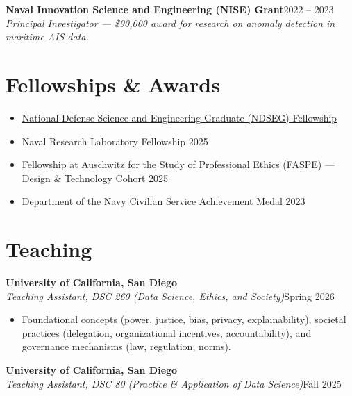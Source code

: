 \documentclass[11pt,letterpaper]{article}
\newcommand{\entry}[4]{%
  \textbf{#1}\hfill #2\\
  \textit{#3}\hfill #4\par}
\begin{document}
\textbf{Naval Innovation Science and Engineering (NISE) Grant}\hfill 2022 – 2023\\
\textit{Principal Investigator — \$90,000 award for research on anomaly detection in maritime AIS data.}

\section{Fellowships \& Awards}

\begin{itemize}
  \item \href{https://ndseg.org/about}{National Defense Science and Engineering Graduate (NDSEG) Fellowship}
  \item Naval Research Laboratory Fellowship \hfill 2025
  \item Fellowship at Auschwitz for the Study of Professional Ethics (FASPE) — Design \& Technology Cohort \hfill 2025
  \item Department of the Navy Civilian Service Achievement Medal \hfill 2023
\end{itemize}

\section{Teaching}

\entry{University of California, San Diego}{}{Teaching Assistant, DSC 260 (Data Science, Ethics, and Society)}{Spring 2026}
\begin{itemize}
  \item Foundational concepts (power, justice, bias, privacy, explainability), societal practices (delegation, organizational incentives, accountability), and governance mechanisms (law, regulation, norms).
\end{itemize}
\vspace{0.5em}

\entry{University of California, San Diego}{}{Teaching Assistant, DSC 80 (Practice \& Application of Data Science)}{Fall 2025}
\end{document}
